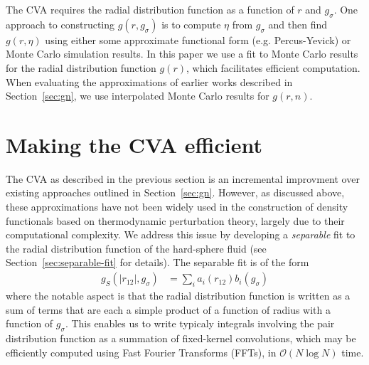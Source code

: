 \documentclass[letterpaper,twocolumn,amsmath,amssymb,pre,aps,10pt]{revtex4-1}
\begin{document}
The CVA requires the radial distribution function as a function of $r$
and $g_\sigma$.  One approach to constructing $g(r,g_\sigma)$ is to
compute $\eta$ from $g_\sigma$ and then find $g(r,\eta)$ using either
some approximate functional form (e.g. Percus-Yevick) or Monte Carlo
simulation results.  In this paper we use a fit to Monte Carlo results
for the radial distribution function $g(r)$, which facilitates
efficient computation.  When evaluating the approximations of earlier
works described in Section~\ref{sec:gn}, we use interpolated Monte
Carlo results for $g(r,n)$.



\section{Making the CVA efficient}
The CVA as described in the previous section is an incremental
improvment over existing approaches outlined in Section~\ref{sec:gn}.
However, as discussed above, these approximations have not been widely
used in the construction of density functionals based on thermodynamic
perturbation theory, largely due to their computational complexity.
We address this issue by developing a \emph{separable} fit to the
radial distribution function of the hard-sphere fluid (see
Section~\ref{sec:separable-fit} for details).  The separable fit is of
the form
\begin{align}
  g_S(|r_{12}|, g_\sigma) &= \sum_{i} a_i(r_{12}) b_i(g_\sigma)
\end{align}
where the notable aspect is that the radial distribution function is
written as a sum of terms that are each a simple product of a function
of radius with a function of $g_\sigma$.  This enables us to write
typicaly integrals involving the pair distribution function as a
summation of fixed-kernel convolutions, which may be efficiently
computed using Fast Fourier Transforms (FFTs), in $\mathcal{O}(N\log
N)$ time.
\end{document}
